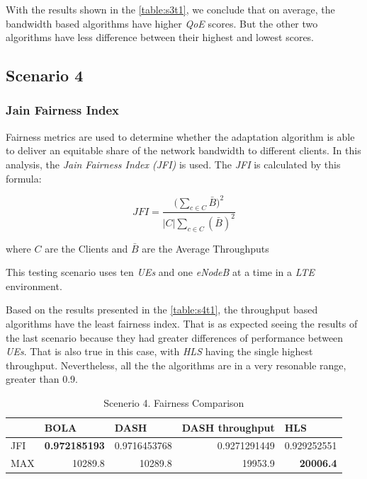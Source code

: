 With the results shown in the \autoref{table:s3t1}, we conclude that on average,
the bandwidth based algorithms have higher \textit{QoE} scores. But the other two
algorithms have less difference between their highest and lowest scores.

\subsection{Scenario 4}

\subsubsection{Jain Fairness Index}

Fairness metrics are used to determine whether the adaptation 
algorithm is able to deliver an equitable share of the network bandwidth 
to different clients. In this analysis, the \textit{Jain Fairness Index (JFI)}
\cite{jfi} is used. The \textit{JFI} is calculated by this formula:

\begin{equation}
    JFI=\frac{\bigg(\sum\limits_{c\in C}\bar{B}\bigg)^2}{\left | C \right |\sum\limits_{c\in C}(\bar{B})^2}
\end{equation}

where  $C$ are the Clients and $\bar{B}$ are the Average Throughputs

This testing scenario uses ten \textit{UEs} and one \textit{eNodeB} at a time in a \textit{LTE} environment.

Based on the results presented in the \autoref{table:s4t1}, the throughput based algorithms 
have the least fairness index. That is as expected seeing the results of the last scenario
because they had greater differences of performance between \textit{UEs}. That is also true in
this case, with \textit{HLS} having the single highest throughput. Nevertheless, all the
the algorithms are in a very resonable range, greater than 0.9.

\begin{table}[h]
    \centering
    \begin{tabular}{@{}lrrrr@{}}
    \toprule
        & \multicolumn{1}{l}{BOLA} & \multicolumn{1}{l}{DASH} & \multicolumn{1}{l}{DASH throughput} & \multicolumn{1}{l}{HLS} \\ \midrule
    JFI & \textbf{0.972185193}     & 0.9716453768             & 0.9271291449                        & 0.929252551             \\
    MAX & 10289.8                  & 10289.8                  & 19953.9                             & \textbf{20006.4}        \\ \bottomrule
    \end{tabular}
    \caption{Scenerio 4. Fairness Comparison}
    \label{table:s4t1}
\end{table}

